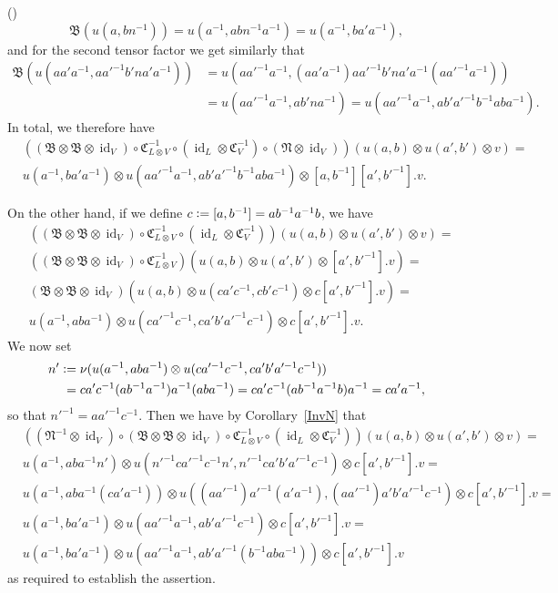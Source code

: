 \documentclass[12pt]{article}
\makeatletter
\newcounter{num}
\newenvironment{pflist}{\begin{list}{(\arabic{num})}{\usecounter{num} \leftmargin0cm \itemindent5pt}}{\end{list}}
\theoremstyle{definition}
\theoremstyle{break}
\renewenvironment{proof}[1][\proofname]{\par
\vspace{-5pt}%
\pushQED{\qed}%
\normalfont
\topsep0pt \partopsep0pt %
\trivlist
\item[\hskip\labelsep
\bfseries
#1\@addpunct{.}]\ignorespaces
}{%
\popQED\endtrivlist\@endpefalse
\addvspace{6pt plus 6pt} %
}
\DeclareMathOperator\id{id}
\newcommand{\fB}{\mathfrak{B}}
\newcommand{\fC}{\mathfrak{C}}
\newcommand{\fN}{\mathfrak{N}}
\renewcommand{\1}{\mathbbm{1}}
\newcommand{\ot}{\mathbin{\otimes}}
\newcommand{\uu}{u}
\newcommand{\deq}{\vcentcolon =}
\makeatother
\begin{document}
\begin{proof}
\begin{pflist}
\[\fB(\uu(a, bn^{-1})) = \uu(a^{-1}, abn^{-1}a^{-1}) = \uu(a^{-1}, b a' a^{-1}),\]
and for the second tensor factor we get similarly that
\begin{align*}
\fB(\uu(a a' a^{-1}, a a'^{-1} b' n a' a^{-1})) &=
\uu(a a'^{-1} a^{-1}, (a a' a^{-1}) a a'^{-1} b' n a' a^{-1} (a a'^{-1} a^{-1})) \\
&= \uu(a a'^{-1} a^{-1}, a b' n a^{-1})
= \uu(a a'^{-1} a^{-1}, a b' a'^{-1} b^{-1} a b a^{-1}).
\end{align*}
In total, we therefore have
\begin{align*}
&((\fB \ot \fB \ot \id_V)  \circ \fC_{L \ot V}^{-1} \circ (\id_L \ot \fC_V^{-1})
\circ (\fN \ot \id_V))(\uu(a,b) \ot \uu(a',b') \ot v) = \\
&\uu(a^{-1}, b a' a^{-1}) \ot \uu(a a'^{-1} a^{-1}, a b' a'^{-1} b^{-1} a b a^{-1})
\ot [a, b^{-1}][a', b'^{-1}].v.
\end{align*}

\item
On the other hand, if we define $c \deq [a,b^{-1}] = a b^{-1} a^{-1} b$, we have
\begin{align*}
&((\fB \ot \fB \ot \id_V)  \circ \fC_{L \ot V}^{-1}
\circ (\id_L \ot \fC_V^{-1}))(\uu(a,b) \ot \uu(a',b') \ot v) = \\
&((\fB \ot \fB \ot \id_V)  \circ \fC_{L \ot V}^{-1})
(\uu(a,b) \ot \uu(a',b') \ot [a', b'^{-1}].v) = \\
&(\fB \ot \fB \ot \id_V)
(\uu(a,b) \ot \uu(c a' c^{-1}, c b' c^{-1}) \ot c [a', b'^{-1}].v) = \\
&\uu(a^{-1}, a b a^{-1}) \ot \uu(c a'^{-1} c^{-1}, c a' b' a'^{-1} c^{-1})
 \ot c [a', b'^{-1}].v.
\end{align*}
We now set
\begin{align*}
n' &\deq \nu(\uu(a^{-1}, a b a^{-1}) \ot \uu(c a'^{-1} c^{-1}, c a' b' a'^{-1} c^{-1})) \\
&\mspace{5mu}
= c a' c^{-1} (a b^{-1} a^{-1}) a^{-1} (a b a^{-1})
= c a' c^{-1} (a b^{-1} a^{-1} b) a^{-1}
= c a' a^{-1},
\end{align*}
so that $n'^{-1} = a a'^{-1} c^{-1}$. Then we have by Corollary~\ref{InvN} that
\begin{align*}
&((\fN^{-1} \ot \id_V) \circ (\fB \ot \fB \ot \id_V)  \circ \fC_{L \ot V}^{-1}
\circ (\id_L \ot \fC_V^{-1}))(\uu(a,b) \ot \uu(a',b') \ot v) = \\
&\uu(a^{-1}, a b a^{-1} n') \ot
\uu(n'^{-1} c a'^{-1} c^{-1} n', n'^{-1} c a' b' a'^{-1} c^{-1})
 \ot c [a', b'^{-1}].v= \\
&\uu(a^{-1}, a b a^{-1} (c a' a^{-1})) \ot
\uu((a a'^{-1}) a'^{-1} (a' a^{-1}), (a a'^{-1}) a' b' a'^{-1} c^{-1})
 \ot c [a', b'^{-1}].v = \\
&\uu(a^{-1}, b a' a^{-1}) \ot \uu(a a'^{-1} a^{-1}, a b' a'^{-1} c^{-1})
 \ot c [a', b'^{-1}].v = \\
&\uu(a^{-1}, b a' a^{-1}) \ot \uu(a a'^{-1} a^{-1} ,a b' a'^{-1} (b^{-1} a b a^{-1}))
 \ot c [a', b'^{-1}].v
\end{align*}
as required to establish the assertion.
\qedhere
\end{pflist}
\end{proof}
\end{document}

